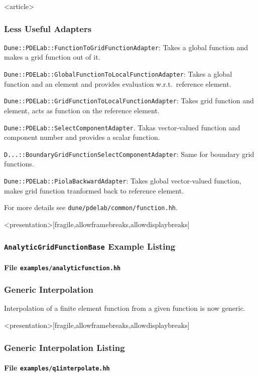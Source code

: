 \begin{frame}<article>
\frametitle<presentation>{Less Useful Adapters}
\lstinline{Dune::PDELab::FunctionToGridFunctionAdapter}: Takes a global
function and makes a grid function out of it.

\lstinline{Dune::PDELab::GlobalFunctionToLocalFunctionAdapter}:
Takes a global function and an element and provides evaluation
w.r.t.~reference element.

\lstinline{Dune::PDELab::GridFunctionToLocalFunctionAdapter}:
Takes grid function and element, acts as function on the
reference element.

\lstinline{Dune::PDELab::SelectComponentAdapter}. Takas
vector-valued function and component number and provides a scalar function.

\lstinline{D...::BoundaryGridFunctionSelectComponentAdapter}:
Same for boundary grid functions.

\lstinline{Dune::PDELab::PiolaBackwardAdapter}: Takes global
vector-valued function, makes grid function tranformed back to
reference element.

For more details see \lstinline{dune/pdelab/common/function.hh}.
\end{frame}

\begin{frame}<presentation>[fragile,allowframebreaks,allowdisplaybreaks]
\frametitle<presentation>{\texttt{AnalyticGridFunctionBase} Example Listing}
\framesubtitle<presentation>{File \texttt{examples/analyticfunction.hh}}

\end{frame}

\begin{frame}
\frametitle<presentation>{Generic Interpolation}
Interpolation of a finite element function from a given function is
now generic.
\end{frame}


\begin{frame}<presentation>[fragile,allowframebreaks,allowdisplaybreaks]
\frametitle<presentation>{Generic Interpolation Listing}
\framesubtitle<presentation>{File \texttt{examples/q1interpolate.hh}}

\end{frame}

